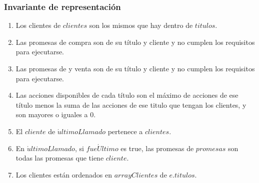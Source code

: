 \subsubsection{Invariante de representaci\'on}
 \renewcommand{\labelenumi}{(\Roman{enumi})}
 \begin{enumerate}
 	\item Los clientes de $clientes$ son los mismos que hay dentro de $titulos$.
 	\item Las promesas de compra  son de su t\'itulo y cliente y no cumplen los requisitos para ejecutarse.
 	\item Las promesas de y venta son de su t\'itulo y cliente y no cumplen los requisitos para ejecutarse.
 	\item Las acciones disponibles de cada t\'itulo son el m\'aximo de acciones de ese t\'itulo menos la suma de las acciones de ese titulo que tengan los clientes, y son mayores o iguales a 0.
 	\item El $cliente$ de $\acute{u}ltimoLlamado$ pertenece a $clientes$.
 	\item En $\acute{u}ltimoLlamado$, si $fue\acute{U}ltimo$ es true, las promesas de $promesas$ son todas las promesas que tiene $cliente$.
 	\item Los clientes est\'an ordenados en $arrayClientes$ de $e.titulos$.
  \end{enumerate}
  
